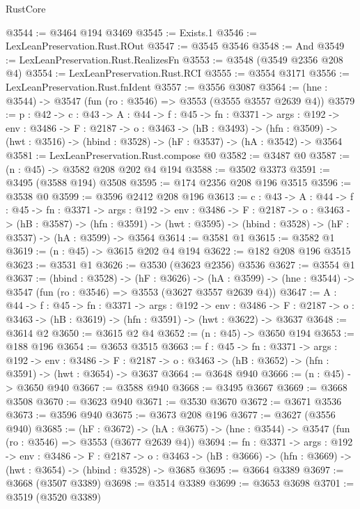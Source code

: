 \begin{lexlean}{RustCore}
\begin{coremodule}
@3544 := @3464 @194 @3469
@3545 := Exists.{1}
@3546 := LexLeanPreservation.Rust.ROut
@3547 := @3545 @3546
@3548 := And
@3549 := LexLeanPreservation.Rust.RealizesFn
@3553 := @3548 (@3549 @2356 @208 @4)
@3554 := LexLeanPreservation.Rust.RCI
@3555 := @3554 @3171
@3556 := LexLeanPreservation.Rust.fnIdent
@3557 := @3556 @3087
@3564 := (hne : @3544) -> @3547 (fun (ro : @3546) => @3553 (@3555 @3557 @2639 @4))
@3579 := {p : @42} ->
  {c : @43} ->
  {A : @44} ->
  {f : @45} ->
  {fn : @3371} ->
  {args : @192} ->
  {env : @3486} ->
  {F : @2187} ->
  {o : @3463} ->
  (hB : @3493) ->
  (hfn : @3509) -> (hwt : @3516) -> (hbind : @3528) -> (hF : @3537) -> (hA : @3542) -> @3564
@3581 := LexLeanPreservation.Rust.compose @0
@3582 := @3487 @0
@3587 := (n : @45) -> @3582 @208 @202 @4 @194
@3588 := @3502 @3373
@3591 := @3495 (@3588 @194) @3508
@3595 := @174 @2356 @208 @196 @3515
@3596 := @3538 @0
@3599 := @3596 @2412 @208 @196
@3613 := {c : @43} ->
  {A : @44} ->
  {f : @45} ->
  {fn : @3371} ->
  {args : @192} ->
  {env : @3486} ->
  {F : @2187} ->
  {o : @3463} ->
  (hB : @3587) ->
  (hfn : @3591) -> (hwt : @3595) -> (hbind : @3528) -> (hF : @3537) -> (hA : @3599) -> @3564
@3614 := @3581 @1
@3615 := @3582 @1
@3619 := (n : @45) -> @3615 @202 @4 @194
@3622 := @182 @208 @196 @3515
@3623 := @3531 @1
@3626 := @3530 (@3623 @2356) @3536
@3627 := @3554 @1
@3637 := (hbind : @3528) ->
  (hF : @3626) ->
  (hA : @3599) -> (hne : @3544) -> @3547 (fun (ro : @3546) => @3553 (@3627 @3557 @2639 @4))
@3647 := {A : @44} ->
  {f : @45} ->
  {fn : @3371} ->
  {args : @192} ->
  {env : @3486} ->
  {F : @2187} -> {o : @3463} -> (hB : @3619) -> (hfn : @3591) -> (hwt : @3622) -> @3637
@3648 := @3614 @2
@3650 := @3615 @2 @4
@3652 := (n : @45) -> @3650 @194
@3653 := @188 @196
@3654 := @3653 @3515
@3663 := {f : @45} ->
  {fn : @3371} ->
  {args : @192} ->
  {env : @3486} ->
  {F : @2187} -> {o : @3463} -> (hB : @3652) -> (hfn : @3591) -> (hwt : @3654) -> @3637
@3664 := @3648 @940
@3666 := (n : @45) -> @3650 @940
@3667 := @3588 @940
@3668 := @3495 @3667
@3669 := @3668 @3508
@3670 := @3623 @940
@3671 := @3530 @3670
@3672 := @3671 @3536
@3673 := @3596 @940
@3675 := @3673 @208 @196
@3677 := @3627 (@3556 @940)
@3685 := (hF : @3672) ->
  (hA : @3675) -> (hne : @3544) -> @3547 (fun (ro : @3546) => @3553 (@3677 @2639 @4))
@3694 := {fn : @3371} ->
  {args : @192} ->
  {env : @3486} ->
  {F : @2187} ->
  {o : @3463} -> (hB : @3666) -> (hfn : @3669) -> (hwt : @3654) -> (hbind : @3528) -> @3685
@3695 := @3664 @3389
@3697 := @3668 (@3507 @3389)
@3698 := @3514 @3389
@3699 := @3653 @3698
@3701 := @3519 (@3520 @3389)

\end{coremodule}
\end{lexlean}
